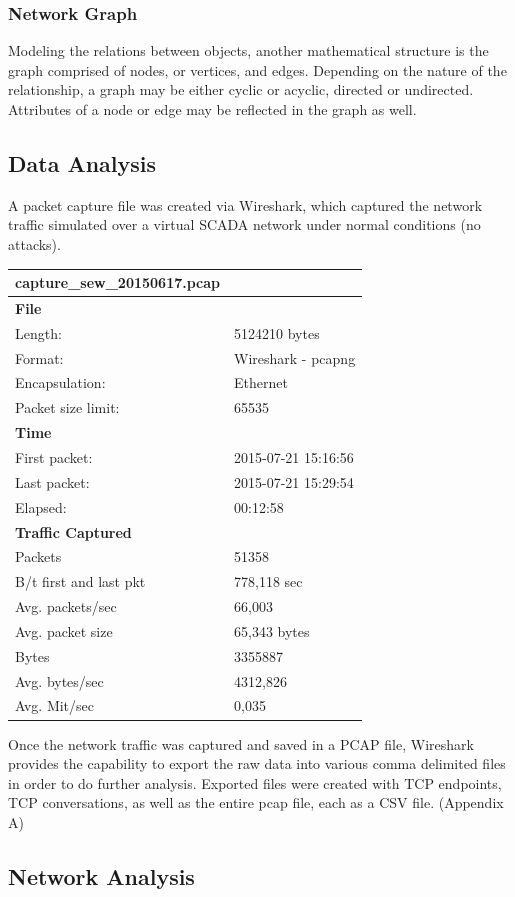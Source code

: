 \documentclass[11pt,]{article}
\begin{document}
\subsubsection{Network Graph}\label{network-graph}

Modeling the relations between objects, another mathematical structure
is the graph comprised of nodes, or vertices, and edges. Depending on
the nature of the relationship, a graph may be either cyclic or acyclic,
directed or undirected. Attributes of a node or edge may be reflected in
the graph as well.

\subsection{Data Analysis}\label{data-analysis}

A packet capture file was created via Wireshark, which captured the
network traffic simulated over a virtual SCADA network under normal
conditions (no attacks).

\begin{longtable}[c]{@{}ll@{}}
\toprule
\textbf{capture\_sew\_20150617.pcap} &\tabularnewline
\midrule
\endhead
\textbf{File} &\tabularnewline
Length: & 5124210 bytes\tabularnewline
Format: & Wireshark - pcapng\tabularnewline
Encapsulation: & Ethernet\tabularnewline
Packet size limit: & 65535\tabularnewline
\textbf{Time} &\tabularnewline
First packet: & 2015-07-21 15:16:56\tabularnewline
Last packet: & 2015-07-21 15:29:54\tabularnewline
Elapsed: & 00:12:58\tabularnewline
\textbf{Traffic Captured} &\tabularnewline
Packets & 51358\tabularnewline
B/t first and last pkt & 778,118 sec\tabularnewline
Avg. packets/sec & 66,003\tabularnewline
Avg. packet size & 65,343 bytes\tabularnewline
Bytes & 3355887\tabularnewline
Avg. bytes/sec & 4312,826\tabularnewline
Avg. Mit/sec & 0,035\tabularnewline
\bottomrule
\end{longtable}

Once the network traffic was captured and saved in a PCAP file,
Wireshark provides the capability to export the raw data into various
comma delimited files in order to do further analysis. Exported files
were created with TCP endpoints, TCP conversations, as well as the
entire pcap file, each as a CSV file. (Appendix A)

\clearpage

\subsection{Network Analysis}\label{network-analysis}
\end{document}
